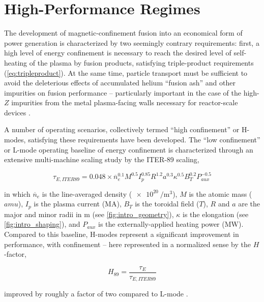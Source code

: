 \chapter{High-Performance Regimes}\label{ch:HighPerformance}

The development of magnetic-confinement fusion into an economical form of power generation is characterized by two seemingly contrary requirements: first, a high level of energy confinement is necessary to reach the desired level of self-heating of the plasma by fusion products, satisfying triple-product requirements (\cref{eq:tripleproduct}).  At the same time, particle transport must be sufficient to avoid the deleterious effects of accumulated helium ``fusion ash'' and other impurities on fusion performance -- particularly important in the case of the high-$Z$ impurities from the metal plasma-facing walls necessary for reactor-scale devices \cite{Loarte2007}.

A number of operating scenarios, collectively termed ``high confinement'' or H-modes\cite{Wagner1982,Keilhacker1984}, satisfying these requirements have been developed.  The ``low confinement'' or L-mode operating baseline of energy confinement is characterized through an extensive multi-machine scaling study \cite{Yushmanov1990} by the ITER-89 scaling,

\begin{equation}\label{eq:tau89}
 \tau_{E,ITER89} = 0.048 \times \overline{n}_e^{0.1} M^{0.5} I_p^{0.85} R^{1.2} a^{0.3} \kappa^{0.5} B_T^{0.2} P_{aux}^{-0.5}
\end{equation}

\noindent in which $\overline{n}_e$ is the line-averaged density ($\SI{e20}{\per\meter\cubed}$), $M$ is the atomic mass ($\si{amu}$), $I_p$ is the plasma current ($\si{\mega\ampere}$), $B_T$ is the toroidal field ($\si{T}$), $R$ and $a$ are the major and minor radii in $\si{\meter}$ (see \cref{fig:intro_geometry}), $\kappa$ is the elongation (see \cref{fig:intro_shaping}), and $P_{aux}$ is the externally-applied heating power ($\si{\mega\watt}$).  Compared to this baseline, H-modes represent a significant improvement in performance, with confinement -- here represented in a normalized sense by the $H$-factor, \ie

\begin{equation}\label{eq:H89}
 H_{89} = \frac{\tau_E}{\tau_{E,ITER89}}
\end{equation}

\noindent improved by roughly a factor of two compared to L-mode \cite{Greenwald1997}.

